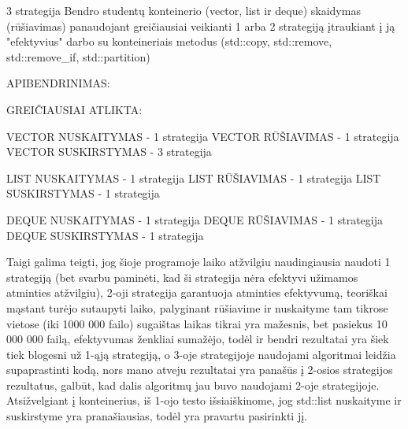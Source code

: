 3 strategija Bendro studentų konteinerio (vector, list ir deque) skaidymas (rūšiavimas) panaudojant greičiausiai veikianti 1 arba 2 strategiją įtraukiant į ją "{}efektyvius"{} darbo su konteineriais metodus (std\+::copy, std\+::remove, std\+::remove\+\_\+if, std\+::partition)











APIBENDRINIMAS\+:



GREIČ\+IAUSIAI ATLIKTA\+:

VECTOR NUSKAITYMAS -\/ 1 strategija VECTOR RŪŠ\+IAVIMAS -\/ 1 strategija VECTOR SUSKIRSTYMAS -\/ 3 strategija

LIST NUSKAITYMAS -\/ 1 strategija LIST RŪŠ\+IAVIMAS -\/ 1 strategija LIST SUSKIRSTYMAS -\/ 1 strategija

DEQUE NUSKAITYMAS -\/ 1 strategija DEQUE RŪŠ\+IAVIMAS -\/ 1 strategija DEQUE SUSKIRSTYMAS -\/ 1 strategija

Taigi galima teigti, jog šioje programoje laiko atžvilgiu naudingiausia naudoti 1 strategiją (bet svarbu paminėti, kad ši strategija nėra efektyvi užimamos atminties atžvilgiu), 2-\/oji strategija garantuoja atminties efektyvumą, teoriškai mąstant turėjo sutaupyti laiko, palyginant rūšiavime ir nuskaityme tam tikrose vietose (iki 1000 000 failo) sugaištas laikas tikrai yra mažesnis, bet pasiekus 10 000 000 failą, efektyvumas ženkliai sumažėjo, todėl ir bendri rezultatai yra šiek tiek blogesni už 1-\/ąją strategiją, o 3-\/oje strategijoje naudojami algoritmai leidžia supaprastinti kodą, nors mano atveju rezultatai yra panašūs į 2-\/osios strategijos rezultatus, galbūt, kad dalis algoritmų jau buvo naudojami 2-\/oje strategijoje. Atsižvelgiant į konteinerius, iš 1-\/ojo testo išsiaiškinome, jog std\+::list nuskaityme ir suskirstyme yra pranašiausias, todėl yra pravartu pasirinkti jį.

